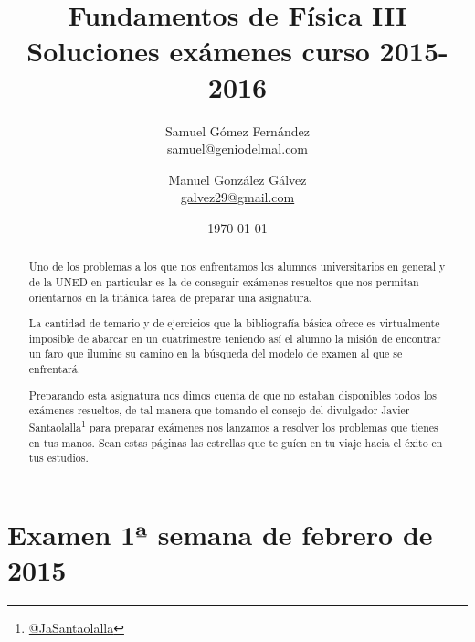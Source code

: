 \documentclass[12pt, a4paper]{article}
\title{Fundamentos de Física III \\ Soluciones exámenes curso 2015-2016}
\date{\today}
\author{
    Samuel Gómez Fernández \\ \href{mailto:samuel@geniodelmal.es}{samuel@geniodelmal.com}
    \and
    Manuel González Gálvez \\ \href{mailto:galvez29@gmail.com}{galvez29@gmail.com}
    }
\begin{document}
    \begin{titlepage}
    \maketitle
    \thispagestyle{empty}
    \hypersetup{pageanchor=true}
    \renewcommand*\contentsname{Contenidos}

    \tableofcontents

    \vspace{1cm}
    \begin{abstract}
        Uno de los problemas a los que nos enfrentamos los alumnos universitarios
        en general y de la UNED en particular es la de conseguir exámenes resueltos
        que nos permitan orientarnos en la titánica tarea de preparar una asignatura.

        La cantidad de temario y de ejercicios que la bibliografía básica ofrece es
        virtualmente imposible de abarcar en un cuatrimestre teniendo así el alumno
        la misión de encontrar un faro que ilumine su camino en la búsqueda del modelo
        de examen al que se enfrentará.

        Preparando esta asignatura nos dimos cuenta de que no estaban disponibles todos los
        exámenes resueltos, de tal manera que tomando el consejo del divulgador
        Javier Santaolalla\footnote{\href{https://twitter.com/jasantaolalla}{@JaSantaolalla}}
        para preparar exámenes nos lanzamos a resolver los problemas que tienes
        en tus manos. Sean estas páginas las estrellas que te guíen en tu viaje
        hacia el éxito en tus estudios.
    \end{abstract}
    \end{titlepage}



    \restoregeometry

    \section{Examen 1ª semana de febrero de 2015}
\end{document}
